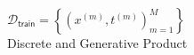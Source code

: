 \documentclass{article}
\begin{document}
\noindent

\begin{math}
  \mathcal D _{\textsf{train}} = \left \{ 
    (x^{(m)}, t^{(m)})_{m=1}^M
  \right \} 
\end{math}
\\
Discrete and Generative Product 


\end{document}
